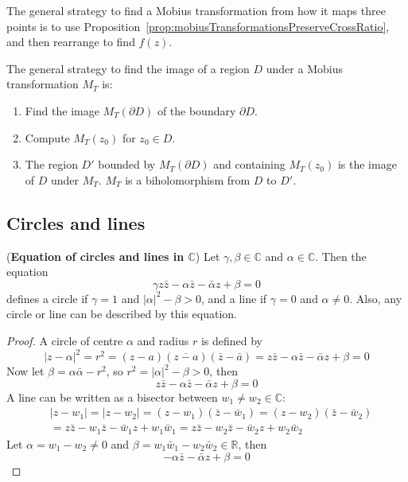 \begin{remark}
	The general strategy to find a Mobius transformation from how it maps three points is to use Proposition~\ref{prop:mobiusTransformationsPreserveCrossRatio}, and then rearrange to find $f(z)$.
\end{remark}

\begin{remark}
	The general strategy to find the image of a region $D$ under a Mobius transformation $M_T$ is:
	\begin{enumerate}
		\item Find the image $M_T(\partial D)$ of the boundary $\partial D$.
		\item Compute $M_T(z_0)$ for $z_0 \in D$.
		\item The region $D'$ bounded by $M_T(\partial D)$ and containing $M_T(z_0)$ is the image of $D$ under $M_T$. $M_T$ is a biholomorphism from $D$ to $D'$.
	\end{enumerate}
\end{remark}

\subsection{Circles and lines}

\begin{lemma}\label{lem:equationOfCirclesAndLines}
	(\textbf{Equation of circles and lines in $\mathbb{C}$}) Let $\gamma, \beta \in \mathbb{C}$ and $\alpha \in \mathbb{C}$. Then the equation
	\[
		\gamma z \bar{z} - \alpha \bar{z} - \bar{\alpha} z + \beta = 0
	\]
	defines a circle if $\gamma = 1$ and $|\alpha|^2 - \beta > 0$, and a line if $\gamma = 0$ and $\alpha \ne 0$. Also, any circle or line can be described by this equation.
\end{lemma}

\begin{proof}
	A circle of centre $\alpha$ and radius $r$ is defined by
	\[
		|z - \alpha|^2 = r^2 = (z - a)(\overline{z - a})(\bar{z} - \bar{a}) = z\bar{z} - \alpha \bar{z} - \bar{\alpha} z + \beta = 0
	\]
	Now let $\beta = \alpha \bar{\alpha} - r^2$, so $r^2 = |\alpha|^2 - \beta > 0$, then
	\[
		z\bar{z} - \alpha\bar{z} - \bar{\alpha}z + \beta = 0
	\]
	A line can be written as a bisector between $w_1 \ne w_2 \in \mathbb{C}$:
	\[
		\begin{aligned}
			& |z - w_1| = |z - w_2| = (z - w_1)(\bar{z} - \bar{w}_1) = (z - w_2)(\bar{z} - \bar{w}_2) \\
			& = z\bar{z} - w_1 \bar{z} - \bar{w}_1 z + w_1 \bar{w}_1 = z\bar{z} - w_2 \bar{z} - \bar{w}_2 z + w_2 \bar{w}_2
		\end{aligned}
	\]
	Let $\alpha = w_1 - w_2 \ne 0$ and $\beta = w_1 \bar{w}_1 - w_2 \bar{w}_2 \in \mathbb{R}$, then
	\[
		-\alpha\bar{z} - \bar{\alpha}z + \beta = 0
	\]
\end{proof}

